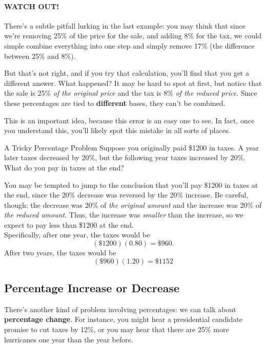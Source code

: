 \paragraph{WATCH OUT!} There's a subtle pitfall lurking in the last example: you may think that since we're removing 25\% of the price for the sale, and adding 8\% for the tax, we could simple combine everything into one step and simply remove 17\% (the difference between 25\% and 8\%).

But that's not right, and if you try that calculation, you'll find that you get a different answer.  What happened?  It may be hard to spot at first, but notice that the sale is 25\% \emph{of the original price} and the tax is 8\% \emph{of the reduced price}.  Since these percentages are tied to \textbf{different} bases, they can't be combined.

This is an important idea, because this error is an easy one to see.  In fact, once you understand this, you'll likely spot this mistake in all sorts of places.

\begin{example}[https://www.youtube.com/watch?v=14sOMJuqxrA]{A Tricky Percentage Problem}
Suppose you originally paid \$1200 in taxes.  A year later taxes decreased by 20\%, but the following year taxes increased by 20\%.  What do you pay in taxes at the end?

\sol

You may be tempted to jump to the conclusion that you'll pay \$1200 in taxes at the end, since the 20\% decrease was reversed by the 20\% increase.  Be careful, though: the decrease was 20\% of \emph{the original amount} and the increase was 20\% of \emph{the reduced amount}.  Thus, the increase was \emph{smaller} than the increase, so we expect to pay less than \$1200 at the end.\\

Specifically, after one year, the taxes would be \[(\$1200)(0.80) = \$960.\]  After two years, the taxes would be \[(\$960)(1.20) = \boxed{\$1152}\]
\end{example}

\subsection{Percentage Increase or Decrease}
There's another kind of problem involving percentages: we can talk about \textbf{percentage change}.  For instance, you might hear a presidential candidate promise to cut taxes by 12\%, or you may hear that there are 25\% more hurricanes one year than the year before.

